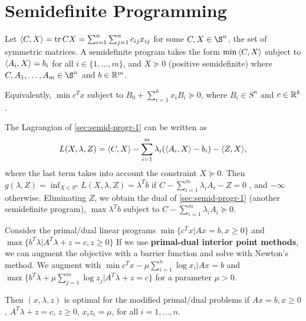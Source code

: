 \section{Semidefinite Programming}
\label{sec:semid-progr}

\begin{defn}
  \label{sec:semid-progr-1}
  Let $\IP{C, X} = \tr CX = \sum_{i=1}^{n} \sum_{j=1}^{n} c_{ij}
  x_{ij}$ for some $C, X \in \S^{n}$, the set of symmetric matrices.
  A semidefinite program takes the form $\min \IP{C, X}$ subject to
  $\IP{A_{i}, X} = b_{i}$ for all $i \in \{ 1, \dots, m \} $, and $X
  \succeq 0$ (positive semidefinite) where $C, A_{1}, \dots, A_{m} \in
  \S^{n}$ and $b \in \mathbb{R}^{m}$.
  
Equivalently, $\min c^{T} x$ subject to $B_{0} + \sum_{i=1}^{k} x_{i}
B_{i} \succeq 0$, where $B_{i} \in S^{n}$ and $c \in \mathbb{R}^{k}$.
\end{defn}

\begin{thm}
  \label{sec:semid-progr-2}
  The Lagrangian of \ref{sec:semid-progr-1} can be written as
  \begin{equation}
    \label{eq:13}
    L(X, \lambda, Z) = \IP{C, X} - \sum_{i=1}^{m} \lambda_{i}
    (\IP{A_{i}, X} - b_{i}) - \IP{Z, X},
  \end{equation} where the last term takes into account the constraint
  $X \succeq 0$. Then $g(\lambda, Z) = \inf_{X \in S^{n}} L(X,
  \lambda, Z) = \lambda^{T} b$ if $C - \sum_{i=1}^{m} \lambda_{i}
  A_{i} - Z = 0$ , and $-\infty$ otherwise.  Eliminating $Z$, we
  obtain the dual of \ref{sec:semid-progr-1} (another semidefinite
  program), $\max \lambda^{T} b$ subject to $C - \sum_{i=1}^{m}
  \lambda_{i} A_{i} \succeq 0$.
\end{thm}

\begin{thm}
  \label{sec:semid-progr-3}
  Consider the primal/dual linear programs $\min \{ c^{T} x | Ax = b,
  x \geq 0 \} $ and $\max \{ b^{T} \lambda | A^{T} \lambda +z = c, z
  \geq 0 \} $  If we use \textbf{primal-dual interior point methods},
  we can augment the objective with a barrier function and solve with
  Newton's method.  We augment with $\min c^{T} x - \mu \sum_{i=1}^{n}
  \log x_{i} | Ax = b$ and $\max \{ b^{T} \lambda + \mu \sum_{j=1}^{m}
  \log z_{j} | A^{T} \lambda + z = c \} $ for a parameter $\mu > 0$.

  Then $(x, \lambda, z)$ is optimal for the modified primal/dual
  problems if $Ax = b, x \geq 0$, $A^{T} \lambda + z = c$, $z \geq 0$,
  $x_{i} z_{i} = \mu$, for all $i = 1, \dots, n$.
\end{thm}

